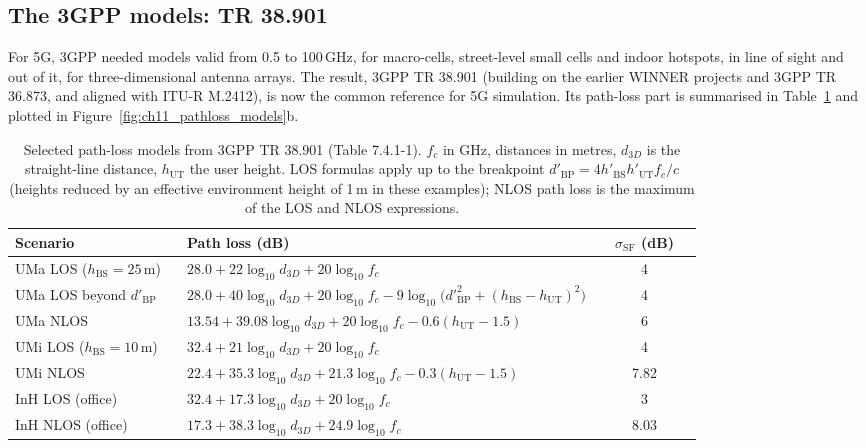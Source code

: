 
\subsection{The 3GPP models: TR 38.901}

For 5G, 3GPP needed models valid from 0.5 to 100\,GHz, for macro-cells, street-level small cells
and indoor hotspots, in line of sight and out of it, for three-dimensional antenna arrays. The
result, 3GPP TR 38.901 (building on the earlier WINNER projects and 3GPP TR 36.873, and aligned with
ITU-R M.2412), is now the common reference for 5G simulation. Its path-loss part is summarised in
Table~\ref{tab:ch11:38901} and plotted in Figure~\ref{fig:ch11_pathloss_models}b.

\begin{table}[htbp]\centering\small
\caption{Selected path-loss models from 3GPP TR 38.901 (Table 7.4.1-1). $f_c$ in GHz, distances in
metres, $d_{3D}$ is the straight-line distance, $h_{\text{UT}}$ the user height. LOS formulas apply
up to the breakpoint $d'_{\text{BP}}=4h'_{\text{BS}}h'_{\text{UT}}f_c/c$ (heights reduced by an
effective environment height of 1\,m in these examples); NLOS path loss is the maximum of the LOS and
NLOS expressions.}
\label{tab:ch11:38901}
\setlength{\tabcolsep}{4pt}
\begin{tabular}{@{}p{0.25\linewidth}p{0.6\linewidth}c@{}}
\toprule
Scenario & Path loss (dB) & $\sigma_{\text{SF}}$ (dB)\\
\midrule
UMa LOS ($h_{\text{BS}}=25$\,m) & $28.0+22\log_{10}d_{3D}+20\log_{10}f_c$ & 4\\
UMa LOS beyond $d'_{\text{BP}}$ & $28.0+40\log_{10}d_{3D}+20\log_{10}f_c-9\log_{10}\!\big(d'^2_{\text{BP}}+(h_{\text{BS}}-h_{\text{UT}})^2\big)$ & 4\\
UMa NLOS & $13.54+39.08\log_{10}d_{3D}+20\log_{10}f_c-0.6(h_{\text{UT}}-1.5)$ & 6\\
UMi LOS ($h_{\text{BS}}=10$\,m) & $32.4+21\log_{10}d_{3D}+20\log_{10}f_c$ & 4\\
UMi NLOS & $22.4+35.3\log_{10}d_{3D}+21.3\log_{10}f_c-0.3(h_{\text{UT}}-1.5)$ & 7.82\\
InH LOS (office) & $32.4+17.3\log_{10}d_{3D}+20\log_{10}f_c$ & 3\\
InH NLOS (office) & $17.3+38.3\log_{10}d_{3D}+24.9\log_{10}f_c$ & 8.03\\
\bottomrule
\end{tabular}
\end{table}


